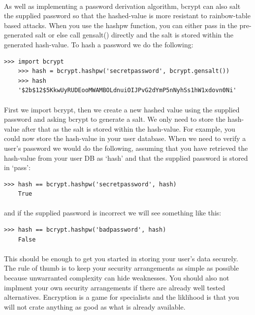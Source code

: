 \documentclass[12pt, a4paper, twoside]{book}
\begin{document}
\paragraph{} As well as implementing a password derivation algorithm, bcrypt can also salt the supplied password so that the hashed-value is more resistant to rainbow-table based attacks. When you use the hashpw function, you can either pass in the pre-generated salt or else call gensalt() directly and the salt is stored within the generated hash-value. To hash a password we do the following:

\begin{lstlisting}[style=DOS]
    >>> import bcrypt
    >>> hash = bcrypt.hashpw('secretpassword', bcrypt.gensalt())
    >>> hash
    '$2b$12$5KkwUyRUDEooMWAMBOLdnuiOIJPvG2dYmP5nNyhSs1hW1xdovn0Ni'
\end{lstlisting}

\paragraph{} First we import bcrypt, then we create a new hashed value using the supplied password and asking bcrypt to generate a salt. We only need to store the hash-value after that as the salt is stored within the hash-value. For example, you could now store the hash-value in your user database. When we need to verify a user's password we would do the following, assuming that you have retrieved the hash-value from your user DB as `hash' and that the supplied password is stored in `pass':

\begin{lstlisting}[style=DOS]
    >>> hash == bcrypt.hashpw('secretpassword', hash)
    True
\end{lstlisting}

\paragraph{} and if the supplied password is incorrect we will see something like this:

\begin{lstlisting}[style=DOS]
    >>> hash == bcrypt.hashpw('badpassword', hash)
    False
\end{lstlisting}

\paragraph{} This should be enough to get you started in storing your user's data securely. The rule of thumb is to keep your security arrangements as simple as possible because unwarranted complexity can hide weaknesses. You should also not implment your own security arrangements if there are already well tested alternatives. Encryption is a game for specialists and the liklihood is that you will not crate anything as good as what is already available.
\end{document}
